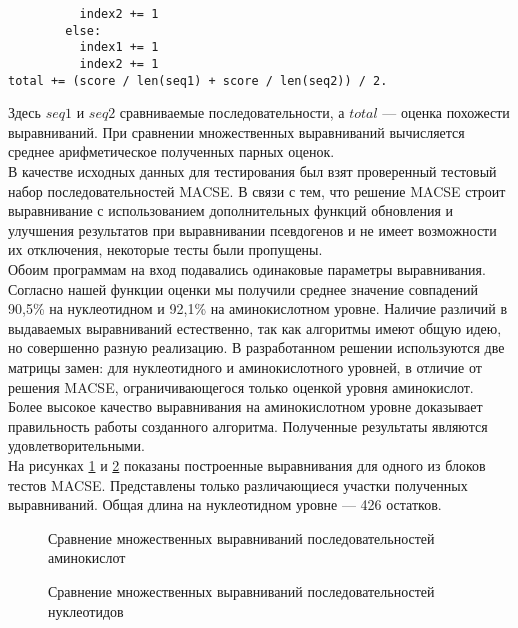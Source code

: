 \begin{algorithm}
	\begin{lstlisting}
          index2 += 1      
        else:
          index1 += 1
          index2 += 1
total += (score / len(seq1) + score / len(seq2)) / 2.
	\end{lstlisting}
\end{algorithm}
Здесь $seq1$ и $seq2$ сравниваемые последовательности, а $total$ --- оценка похожести выравниваний. При сравнении множественных выравниваний вычисляется среднее арифметическое полученных парных оценок.\\
\indent В качестве исходных данных для тестирования был взят проверенный тестовый набор последовательностей MACSE. В связи с тем, что решение MACSE строит выравнивание с использованием дополнительных функций обновления и улучшения результатов при выравнивании псевдогенов и не имеет возможности их отключения, некоторые тесты были пропущены. \\
\indent Обоим программам на вход подавались одинаковые параметры выравнивания. Согласно нашей функции оценки мы получили среднее значение совпадений 90,5\% на нуклеотидном и 92,1\% на аминокислотном уровне. Наличие различий в выдаваемых выравниваний естественно, так как алгоритмы имеют общую идею, но совершенно разную реализацию. В разработанном решении используются две матрицы замен: для нуклеотидного и аминокислотного уровней, в отличие от решения MACSE, ограничивающегося только оценкой уровня аминокислот. Более высокое качество выравнивания на аминокислотном уровне доказывает правильность работы созданного алгоритма. Полученные результаты являются удовлетворительными.\\
\indent На рисунках \ref{ris:MM_AA} и \ref{ris:MM_NT} показаны построенные выравнивания для одного из блоков тестов MACSE. Представлены только различающиеся участки полученных выравниваний. Общая длина на нуклеотидном уровне --- 426 остатков.

\begin{figure}[H]
	\caption{Сравнение множественных выравниваний последовательностей аминокислот}
	\label{ris:MM_AA}
\end{figure}

\begin{figure}[H]
	\caption{Сравнение множественных выравниваний последовательностей нуклеотидов}
	\label{ris:MM_NT}
\end{figure}

